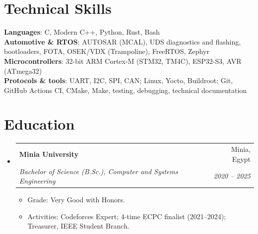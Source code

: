 \documentclass[letterpaper,11pt]{article}
\makeatletter
\newcommand{\resumeItem}[1]{
  \item\small{
    {#1 \vspace{-2pt}}
  }
}
\newcommand{\resumeSubheading}[4]{
  \vspace{-2pt}\item
    \begin{tabular*}{0.97\textwidth}[t]{l@{\extracolsep{\fill}}r}
      \textbf{#1} & #2 \\
      \textit{\small#3} & \textit{\small #4} \\
    \end{tabular*}\vspace{-7pt}
}
\newcommand{\resumeSubHeadingListStart}{\begin{itemize}[leftmargin=0.15in, label={}]}
\newcommand{\resumeSubHeadingListEnd}{\end{itemize}}
\newcommand{\resumeItemListStart}{\begin{itemize}}
\newcommand{\resumeItemListEnd}{\end{itemize}\vspace{-5pt}}
\makeatother
\begin{document}
%
\section{Technical Skills}
 \begin{itemize}[leftmargin=0.15in, label={}]
    \small{\item{
     \textbf{Languages}{: C, Modern C++, Python, Rust, Bash} \\
     \textbf{Automotive \& RTOS}{: AUTOSAR (MCAL), UDS diagnostics and flashing, bootloaders, FOTA, OSEK/VDX (Trampoline), FreeRTOS, Zephyr} \\
     \textbf{Microcontrollers}{: 32-bit ARM Cortex-M (STM32, TM4C), ESP32-S3, AVR (ATmega32)} \\
     \textbf{Protocols \& tools}{: UART, I2C, SPI, CAN; Linux, Yocto, Buildroot; Git, GitHub Actions CI, CMake, Make, testing, debugging, technical documentation}
    }}
 \end{itemize}

\section{Education}
  \resumeSubHeadingListStart
    \resumeSubheading
      {Minia University}{Minia, Egypt}
      {Bachelor of Science (B.Sc.), Computer and Systems Engineering}{2020 -- 2025}
      \resumeItemListStart
        \resumeItem{Grade: Very Good with Honors.}
        \resumeItem{Activities: Codeforces Expert; 4-time ECPC finalist (2021--2024); Treasurer, IEEE Student Branch.}
      \resumeItemListEnd
  \resumeSubHeadingListEnd


\end{document}
